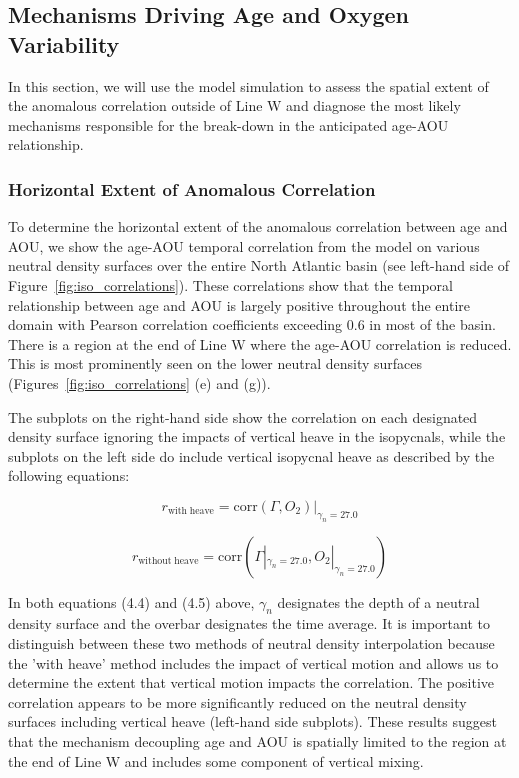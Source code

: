 \subsection{Mechanisms Driving Age and Oxygen Variability}
In this section, we will use the model simulation to assess the spatial extent of
the anomalous correlation outside of Line W and diagnose the most likely mechanisms
responsible for the break-down in the anticipated age-AOU relationship.

\subsubsection{Horizontal Extent of Anomalous Correlation}

To determine the horizontal extent of the anomalous correlation between age and
AOU, we show the age-AOU temporal correlation from the model on various neutral
density surfaces over the entire North Atlantic basin (see left-hand side of
Figure~\ref{fig:iso_correlations}). These correlations show that the temporal
relationship between age and AOU is largely positive throughout the entire domain
with Pearson correlation coefficients exceeding 0.6 in most of the basin. There
is a region at the end of Line W where the age-AOU correlation is reduced. This
is most prominently seen on the lower neutral density surfaces
(Figures~\ref{fig:iso_correlations} (e) and (g)).

The subplots on the right-hand side show the correlation on each designated
density surface ignoring the impacts of vertical heave in the isopycnals, while
the subplots on the left side do include vertical isopycnal heave as described
by the following equations:

\begin{equation}
	r_{\mathrm{with \; heave}} = \mathrm{corr}(\Gamma, O_2)|_{\gamma_n = 27.0}
\end{equation}

\begin{equation}
	r_{\mathrm{without \; heave}} = \mathrm{corr}(\Gamma|_{\gamma_n = 27.0}, O_2|_{\gamma_n = 27.0})
\end{equation}

In both equations (4.4) and (4.5) above, $\gamma_n$ designates the depth of a
neutral density surface and the overbar designates the time average. It is
important to distinguish between these two methods of neutral density interpolation
because the 'with heave' method includes the impact of vertical motion and allows
us to determine the extent that vertical motion impacts the correlation. The
positive correlation appears to be more significantly reduced on the neutral density
surfaces including vertical heave (left-hand side subplots). These results
suggest that the mechanism decoupling age and AOU is spatially limited to the
region at the end of Line W and includes some component of vertical mixing.

